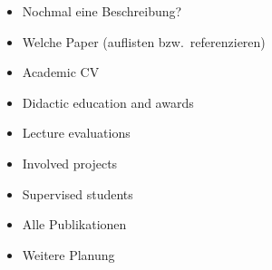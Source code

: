 \documentclass[12pt,twoside,a4paper]{article}
\begin{document}
 

\begin{itemize}
  \item Nochmal eine Beschreibung?
  \item Welche Paper (auflisten bzw.~referenzieren)
  \item Academic CV
  \item Didactic education and awards
  \item Lecture evaluations
  \item Involved projects
  \item Supervised students
  \item Alle Publikationen
  \item Weitere Planung
\end{itemize}
\end{document}
